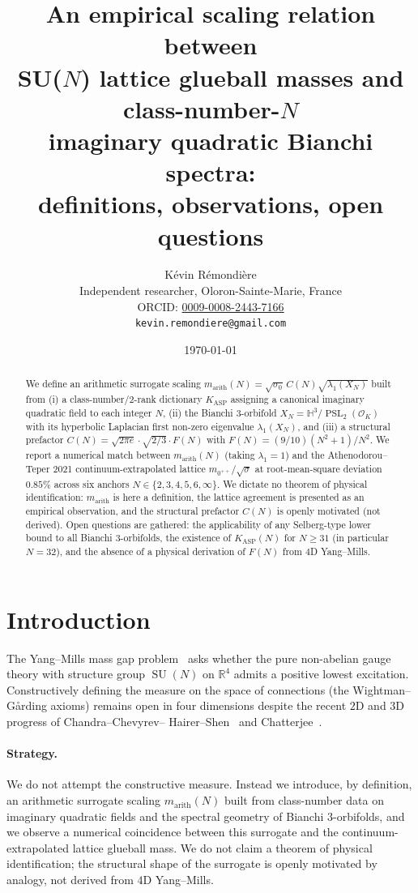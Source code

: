 \documentclass[11pt,a4paper]{article}
\title{An empirical scaling relation between\\
SU($N$) lattice glueball masses and class-number-$N$\\
imaginary quadratic Bianchi spectra:\\
definitions, observations, open questions}
\author{K\'evin R\'emondi\`ere\\
\small{Independent researcher, Oloron-Sainte-Marie, France}\\
\small{ORCID: \href{https://orcid.org/0009-0008-2443-7166}{0009-0008-2443-7166}}\\
\small{\texttt{kevin.remondiere@gmail.com}}}
\date{\today}
\theoremstyle{definition}
\DeclareMathOperator{\PSL}{PSL}
\DeclareMathOperator{\SU}{SU}
\newcommand{\KASP}{K_{\mathrm{ASP}}}
\newcommand{\marith}{m_{\mathrm{arith}}}
\newcommand{\HH}{\mathbb{H}}
\newcommand{\RR}{\mathbb{R}}
\newcommand{\OK}{\mathcal{O}_K}
\begin{document}
\maketitle

\begin{abstract}
We define an arithmetic surrogate scaling $\marith(N) = \sqrt{\sigma_0}\,C(N)\sqrt{\lambda_1(X_N)}$ built from (i) a class-number/2-rank dictionary $\KASP$ assigning a canonical imaginary quadratic field to each integer $N$, (ii) the Bianchi $3$-orbifold $X_N = \HH^3/\PSL_2(\OK)$ with its hyperbolic Laplacian first non-zero eigenvalue $\lambda_1(X_N)$, and (iii) a structural prefactor $C(N) = \sqrt{2\pi e}\cdot\sqrt{2/3}\cdot F(N)$ with $F(N) = (9/10)(N^2+1)/N^2$. We report a numerical match between $\marith(N)$ (taking $\lambda_1=1$) and the Athenodorou--Teper 2021 continuum-extrapolated lattice $m_{0^{++}}/\sqrt{\sigma}$ at root-mean-square deviation $0.85\%$ across six anchors $N\in\{2,3,4,5,6,\infty\}$. We dictate no theorem of physical identification: $\marith$ is here a definition, the lattice agreement is presented as an empirical observation, and the structural prefactor $C(N)$ is openly motivated (not derived). Open questions are gathered: the applicability of any Selberg-type lower bound to all Bianchi $3$-orbifolds, the existence of $\KASP(N)$ for $N\geq 31$ (in particular $N=32$), and the absence of a physical derivation of $F(N)$ from $4$D Yang--Mills.
\end{abstract}

\section{Introduction}

The Yang--Mills mass gap problem~\cite{JaffeWitten} asks whether the pure
non-abelian gauge theory with structure group $\SU(N)$ on $\RR^4$ admits a
positive lowest excitation. Constructively defining the measure on the space
of connections (the Wightman--G\aa rding axioms) remains open in four
dimensions despite the recent $2$D and $3$D progress of Chandra--Chevyrev--
Hairer--Shen~\cite{CCHS} and Chatterjee~\cite{Chatterjee2019}.

\paragraph{Strategy.} We do not attempt the constructive measure. Instead we
introduce, by definition, an arithmetic surrogate scaling $\marith(N)$
built from class-number data on imaginary quadratic fields and the spectral
geometry of Bianchi $3$-orbifolds, and we observe a numerical coincidence
between this surrogate and the continuum-extrapolated lattice glueball mass.
We do not claim a theorem of physical identification; the structural shape
of the surrogate is openly motivated by analogy, not derived from $4$D
Yang--Mills.
\end{document}

